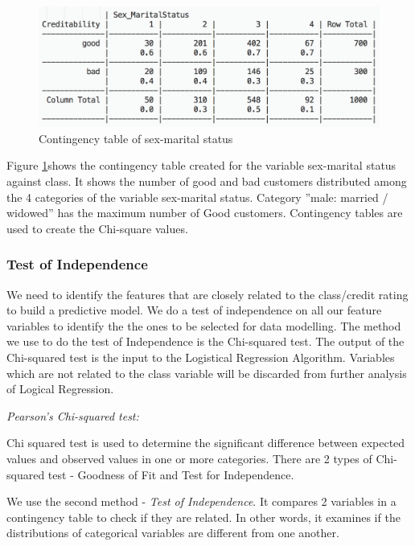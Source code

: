 \documentclass[sigconf]{acmart}
\begin{document}
\begin{figure}[htb]
  \centering
  \includegraphics[width=1.0\columnwidth]{images/Figure20.png}
  \caption{Contingency table of sex-marital status
  \cite{psu-site}}
  \label{fig:Figure20} 
\end{figure}

Figure \ref{fig:Figure20}shows the contingency table created for the variable sex-marital status against class. It shows the number of good and bad customers distributed among the 4 categories of the variable sex-marital status. Category ''male: married / widowed'' has the maximum number of Good customers. Contingency tables are used to create the Chi-square values.

\subsubsection{Test of Independence}

We need to identify the features that are closely related to the class/credit rating to build a predictive model. We do a test of independence on all our feature variables to identify the the ones to be selected for data modelling. The method we use to do the test of Independence is the Chi-squared test. The output of the Chi-squared test is the input to the Logistical Regression Algorithm. Variables which are not related to the class variable will be discarded from further analysis of Logical Regression. 

\textit{Pearson's Chi-squared test:}

Chi squared test is used to determine the significant difference between expected values and observed values in one or more categories. There are 2 types of Chi-squared test - Goodness of Fit and Test for Independence. 

We use the second method - \emph{Test of Independence}. It compares 2 variables in a contingency table to check if they are related. In other words, it examines if the distributions of categorical variables are different from one another. 
\end{document}
